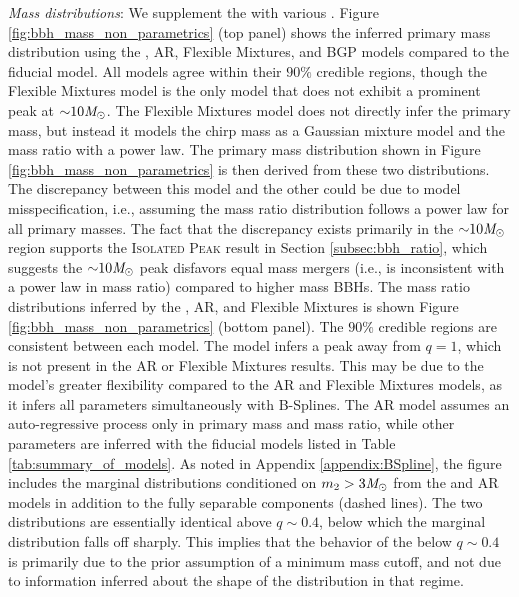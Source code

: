 \textit{Mass distributions}: We supplement the \parametric with various \nonparametrics. Figure \ref{fig:bbh_mass_non_parametrics} (top panel) shows the inferred primary mass distribution using the \BSpline, AR, Flexible Mixtures, and BGP models compared to the fiducial \BrokenPLTwoPeaks model. All models agree within their $90\%$ credible regions, though the Flexible Mixtures model is the only model that does not exhibit a prominent peak at ${\sim}10 \mathit{M_\odot}$. The Flexible Mixtures model does not directly infer the primary mass, but instead it models the chirp mass as a Gaussian mixture model and the mass ratio with a power law. The primary mass distribution shown in Figure \ref{fig:bbh_mass_non_parametrics} is then derived from these two distributions. The discrepancy between this model and the other \nonparametrics could be due to model misspecification, i.e., assuming the mass ratio distribution follows a power law for all primary masses. The fact that the discrepancy exists primarily in the ${\sim}10 \mathit{M_\odot}$ region supports the \textsc{Isolated Peak} result in Section \ref{subsec:bbh_ratio}, which suggests the ${\sim}10 \mathit{M_\odot}$ peak disfavors equal mass mergers (i.e., is inconsistent with a power law in mass ratio) compared to higher mass \acp{BBH}. The mass ratio distributions inferred by the \BSpline, AR, and Flexible Mixtures is shown Figure \ref{fig:bbh_mass_non_parametrics} (bottom panel). The $90\%$ credible regions are consistent between each model. The \BSpline model infers a peak away from $q=1$, which is not present in the AR or Flexible Mixtures results. This may be due to the \BSpline model's greater flexibility compared to the AR and Flexible Mixtures models, as it infers all parameters simultaneously with B-Splines. The AR model assumes an auto-regressive process only in primary mass and mass ratio, while other parameters are inferred with the fiducial models listed in Table \ref{tab:summary_of_models}. As noted in Appendix \ref{appendix:BSpline}, the figure includes the marginal distributions conditioned on $m_2 > 3\mathit{M_\odot}$ from the \BSpline and AR models in addition to the fully separable components (dashed lines). The two distributions are essentially identical above $q \sim0.4$, below which the marginal distribution falls off sharply. This implies that the behavior of the \parametric below $q \sim 0.4$ is primarily due to the prior assumption of a minimum mass cutoff, and not due to information inferred about the shape of the distribution in that regime. 

